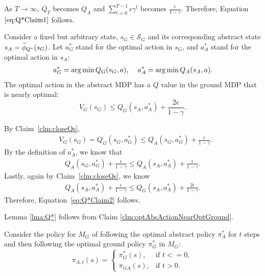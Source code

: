 As $T \rightarrow \infty$, $Q_T$ becomes $Q_A$ and $\sum_{t=0}^{T-1} \epsilon \gamma^t$ becomes $\frac{\epsilon}{1-\gamma}$. Therefore, Equation $\ref{eq:Q*Claim1}$ follows. \\

\begin{clm}
\label{clm:optAbsActionNearOptGround}

Consider a fixed but arbitrary state, $s_G \in \mathcal{S}_G$ and its corresponding abstract state $s_A=\widetilde \phi_{Q^*}(s_G)$.
Let $a^*_G$ stand for the optimal action in $s_G$, and $a^*_A$ stand for the optimal action in $s_A$:
\begin{align*}
a^*_G = \operatorname*{arg\,min} Q_G(s_G, a), \hspace{4mm}
a^*_A = \operatorname*{arg\,min} Q_A(s_A, a).
\end{align*}
The optimal action in the abstract MDP has a $Q$ value in the ground MDP that is nearly optimal:
\begin{equation}
\label{eq:Q*Claim2}
V_G(s_G) \leq Q_G(s_A, a^*_A) + \frac{2\epsilon}{1-\gamma}.
\end{equation}
\end{clm}

By Claim~\ref{clm:closeQs},
\begin{align}
&V_G(s_G) = Q_G(s_G, a^*_G) \leq Q_A(s_G, a^*_G) + \frac{\epsilon}{1-\gamma}.
\label{eq:Q*OptActionResult}
\end{align}
By the definition of $a^*_A$, we know that 
\begin{align}
Q_A(s_G, a^*_G) + \frac{\epsilon}{1-\gamma} \leq Q_A(s_A, a^*_A) + \frac{\epsilon}{1-\gamma}.
\end{align}
Lastly, again by Claim~\ref{clm:closeQs}, we know
\begin{align}
Q_A(s_A, a^*_A) + \frac{\epsilon}{1-\gamma} \leq Q_G(s_A, a^*_A) + \frac{2\epsilon}{1-\gamma}.
\end{align}
Therefore, Equation~\ref{eq:Q*Claim2} follows.

\begin{clm}
Lemma \ref{lma:Q*} follows from Claim \ref{clm:optAbsActionNearOptGround}.
\end{clm}

Consider the policy for $M_G$ of following the optimal abstract policy $\pi^*_A$ for $t$ steps and then following the optimal ground policy $\pi^*_G$ in $M_G$:
\begin{equation}
\pi_{A,t}(s)=
\begin{cases}
\pi_G^*(s), &\text{if } t<=0,\\
\pi_{GA}(s), &\text{if } t > 0.
\end{cases}
\end{equation}

